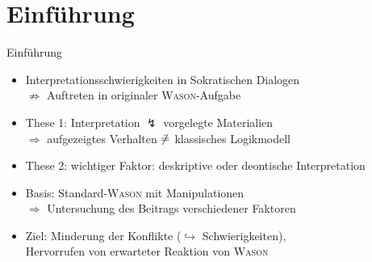 
{
    \section{Einführung}
}

\begin{frame}{Einführung {\scriptsize \cite[S.~93-95]{stenningHumanReasoningCognitive2008}}}
    \begin{itemize}
        \item Interpretationsschwierigkeiten in Sokratischen Dialogen \\
            $\not \Rightarrow$ Auftreten in originaler \textsc{Wason}-Aufgabe

        \item These 1: Interpretation $\lightning$ vorgelegte Materialien \\
            $\Rightarrow$ aufgezeigtes Verhalten $\centernot {\hat=}$ klassisches Logikmodell

        \item These 2: wichtiger Faktor: deskriptive oder deontische Interpretation
        
        \pause
        \item Basis: Standard-\textsc{Wason} mit \alert{Manipulationen} \\
            $\Rightarrow$ Untersuchung des Beitrags verschiedener Faktoren
        
        \item Ziel: Minderung der Konflikte ($\hookrightarrow$ Schwierigkeiten), \\
            Hervorrufen von erwarteter Reaktion von \textsc{Wason}
    \end{itemize}
\end{frame}
